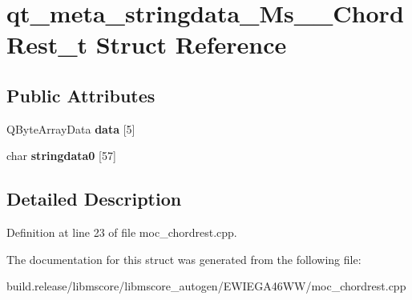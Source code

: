 \hypertarget{structqt__meta__stringdata___ms_____chord_rest__t}{}\section{qt\+\_\+meta\+\_\+stringdata\+\_\+\+Ms\+\_\+\+\_\+\+Chord\+Rest\+\_\+t Struct Reference}
\label{structqt__meta__stringdata___ms_____chord_rest__t}
\subsection*{Public Attributes}
\begin{DoxyCompactItemize}
\item 
\mbox{\label{structqt__meta__stringdata___ms_____chord_rest__t_a6d98dbb633888988e4f699c4472f6635}} 
Q\+Byte\+Array\+Data {\bfseries data} \mbox{[}5\mbox{]}
\item 
\mbox{\label{structqt__meta__stringdata___ms_____chord_rest__t_a51867e5956a3aa736897916212e5aab0}} 
char {\bfseries stringdata0} \mbox{[}57\mbox{]}
\end{DoxyCompactItemize}


\subsection{Detailed Description}


Definition at line 23 of file moc\+\_\+chordrest.\+cpp.



The documentation for this struct was generated from the following file\+:\begin{DoxyCompactItemize}
\item 
build.\+release/libmscore/libmscore\+\_\+autogen/\+E\+W\+I\+E\+G\+A46\+W\+W/moc\+\_\+chordrest.\+cpp\end{DoxyCompactItemize}
